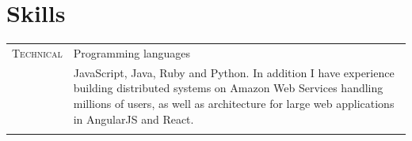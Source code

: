 \documentclass[a4paper,10pt]{article}
\begin{document}
\section{Skills}
\begin{tabular}{r|p{12cm}}
  \textsc{Technical}& Programming languages  \\&\footnotesize{JavaScript, Java, Ruby and Python. In addition I have experience building distributed systems on Amazon Web Services handling millions of users, as well as architecture for large web applications in AngularJS and React. }
  \\\multicolumn{2}{c}{}\\

\end{tabular}
\end{document}
